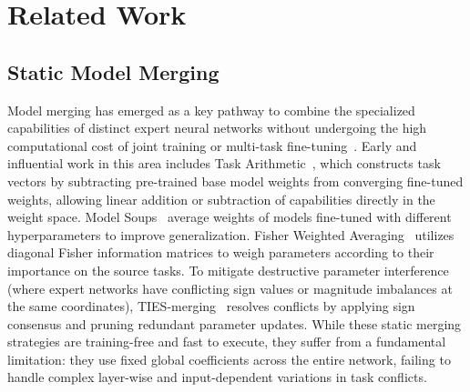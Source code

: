 \section{Related Work}
\label{sec:related_work}

\subsection{Static Model Merging}
Model merging has emerged as a key pathway to combine the specialized capabilities of distinct expert neural networks without undergoing the high computational cost of joint training or multi-task fine-tuning~\cite{wortsman2022model, jin2022dataless}. Early and influential work in this area includes Task Arithmetic~\cite{ilharco2022editing}, which constructs task vectors by subtracting pre-trained base model weights from converging fine-tuned weights, allowing linear addition or subtraction of capabilities directly in the weight space. Model Soups~\cite{wortsman2022model} average weights of models fine-tuned with different hyperparameters to improve generalization. Fisher Weighted Averaging~\cite{matena2021merging} utilizes diagonal Fisher information matrices to weigh parameters according to their importance on the source tasks. To mitigate destructive parameter interference (where expert networks have conflicting sign values or magnitude imbalances at the same coordinates), TIES-merging~\cite{yadav2023ties} resolves conflicts by applying sign consensus and pruning redundant parameter updates. While these static merging strategies are training-free and fast to execute, they suffer from a fundamental limitation: they use fixed global coefficients across the entire network, failing to handle complex layer-wise and input-dependent variations in task conflicts.

